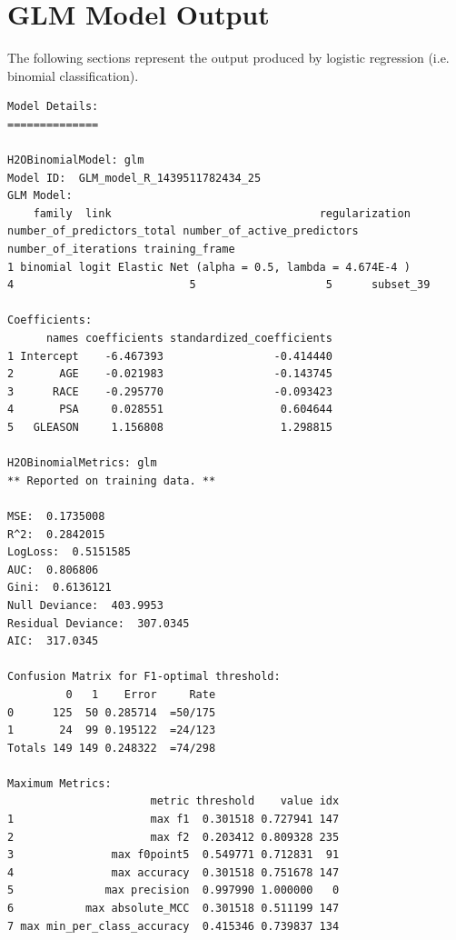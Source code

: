 
\section{GLM Model Output}

The following sections represent the output produced by logistic regression (i.e. binomial classification).

\waterExampleInR


\newpage
\waterExampleInPython


\begin{lstlisting}[style=output]
Model Details:
==============

H2OBinomialModel: glm
Model ID:  GLM_model_R_1439511782434_25 
GLM Model:
    family  link                                regularization number_of_predictors_total number_of_active_predictors number_of_iterations training_frame
1 binomial logit Elastic Net (alpha = 0.5, lambda = 4.674E-4 )                          4                           5                    5      subset_39

Coefficients:
      names coefficients standardized_coefficients
1 Intercept    -6.467393                 -0.414440
2       AGE    -0.021983                 -0.143745
3      RACE    -0.295770                 -0.093423
4       PSA     0.028551                  0.604644
5   GLEASON     1.156808                  1.298815

H2OBinomialMetrics: glm
** Reported on training data. **

MSE:  0.1735008
R^2:  0.2842015
LogLoss:  0.5151585
AUC:  0.806806
Gini:  0.6136121
Null Deviance:  403.9953
Residual Deviance:  307.0345
AIC:  317.0345

Confusion Matrix for F1-optimal threshold:
         0   1    Error     Rate
0      125  50 0.285714  =50/175
1       24  99 0.195122  =24/123
Totals 149 149 0.248322  =74/298

Maximum Metrics:
                      metric threshold    value idx
1                     max f1  0.301518 0.727941 147
2                     max f2  0.203412 0.809328 235
3               max f0point5  0.549771 0.712831  91
4               max accuracy  0.301518 0.751678 147
5              max precision  0.997990 1.000000   0
6           max absolute_MCC  0.301518 0.511199 147
7 max min_per_class_accuracy  0.415346 0.739837 134


\end{lstlisting}
